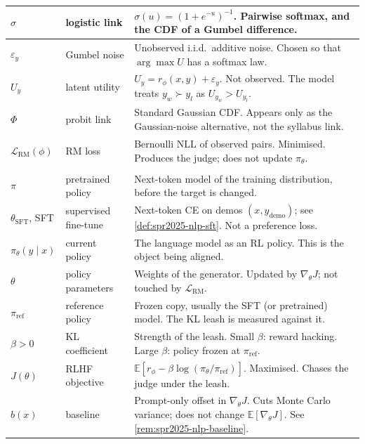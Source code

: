 \documentclass[11pt,a4paper]{article}
\theoremstyle{definition}
\begin{document}
{\begin{center}
\begin{tabularx}{\linewidth}{|
  >{\raggedright\arraybackslash}p{2.35cm}|
  >{\raggedright\arraybackslash}p{2.15cm}|
  >{\raggedright\arraybackslash}X|
}
\hline
\(\sigma\) & logistic link & \(\sigma(u)=(1+e^{-u})^{-1}\). Pairwise softmax, and the CDF of a Gumbel difference. \\
\hline
\(\varepsilon_y\) & Gumbel noise & Unobserved i.i.d.\ additive noise. Chosen so that \(\arg\max U\) has a softmax law. \\
\hline
\(U_y\) & latent utility & \(U_y=r_\phi(x,y)+\varepsilon_y\). Not observed. The model treats \(y_w\succ y_l\) as \(U_{y_w}>U_{y_l}\). \\
\hline
\(\Phi\) & probit link & Standard Gaussian CDF. Appears only as the Gaussian-noise alternative, not the syllabus link. \\
\hline
\(\mathcal{L}_{\mathrm{RM}}(\phi)\) & RM loss & Bernoulli NLL of observed pairs. Minimised. Produces the judge; does not update \(\pi_\theta\). \\
\hline
\multicolumn{3}{|l|}{\textit{Generator \(\pi_\theta\) (stage~2 trains \(\theta\); \(\pi_{\mathrm{ref}}\) stays frozen)}} \\
\hline
\(\pi\) & pretrained policy & Next-token model of the training distribution, before the target is changed. \\
\hline
\(\theta_{\mathrm{SFT}}\), SFT & supervised fine-tune & Next-token CE on demos \((x,y_{\mathrm{demo}})\); see \cref{def:spr2025-nlp-sft}. Not a preference loss. \\
\hline
\(\pi_\theta(y\mid x)\) & current policy & The language model as an RL policy. This is the object being aligned. \\
\hline
\(\theta\) & policy parameters & Weights of the generator. Updated by \(\nabla_\theta J\); not touched by \(\mathcal{L}_{\mathrm{RM}}\). \\
\hline
\(\pi_{\mathrm{ref}}\) & reference policy & Frozen copy, usually the SFT (or pretrained) model. The KL leash is measured against it. \\
\hline
\(\beta>0\) & KL coefficient & Strength of the leash. Small \(\beta\): reward hacking. Large \(\beta\): policy frozen at \(\pi_{\mathrm{ref}}\). \\
\hline
\(J(\theta)\) & RLHF objective & \(\mathbb{E}[r_\phi-\beta\log(\pi_\theta/\pi_{\mathrm{ref}})]\). Maximised. Chases the judge under the leash. \\
\hline
\(b(x)\) & baseline & Prompt-only offset in \(\nabla_\theta J\). Cuts Monte Carlo variance; does not change \(\mathbb{E}[\nabla_\theta J]\). See \cref{rem:spr2025-nlp-baseline}. \\
\hline
\end{tabularx}
\end{center}
}
\end{document}
